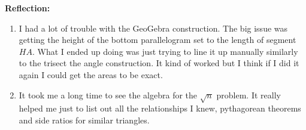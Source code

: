 \documentclass[12pt]{article}
\theoremstyle{homework}
\begin{document}
\vspace{.5in}



\textbf{Reflection:}
\begin{enumerate}
\item I had a lot of trouble with the GeoGebra construction. The big issue was getting the height of the bottom parallelogram set to the length of segment $HA$. 
What I ended up doing was just trying to line it up manually similarly to the trisect the angle construction. It kind of worked but I think if I did it again I could get the areas to be exact. 
\item It took me a long time to see the algebra for the $\sqrt{n}$ problem. It really helped me just to list out all the relationships I knew, pythagorean theorems and side ratios for similar triangles. 
\end{enumerate}
\end{document}
